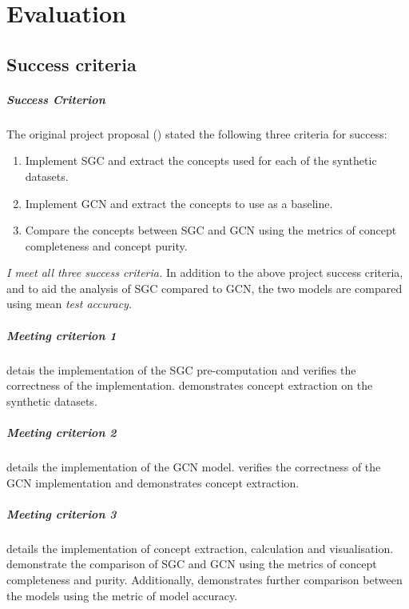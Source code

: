 \chapter{Evaluation}
\label{ch:evaluation}

\section{Success criteria}

\paragraph{Success Criterion}
The original project proposal () stated the following three criteria for success:
\begin{enumerate}
    \item 
        Implement SGC and extract the concepts used for each of the synthetic datasets.
        \label{crit1}
    \item 
        Implement GCN and extract the concepts to use as a baseline.
        \label{crit2}
    \item 
        Compare the concepts between SGC and GCN using the metrics of concept completeness and concept purity.
        \label{crit3}
\end{enumerate}

\emph{I meet all three success criteria.}
In addition to the above project success criteria, and to aid the analysis of SGC compared to GCN, the two models are compared using mean \emph{test accuracy}.

\paragraph{Meeting criterion 1}
 detais the implementation of the SGC pre-computation and  verifies the correctness of the implementation.
 demonstrates concept extraction on the synthetic datasets.

\paragraph{Meeting criterion 2}
 details the implementation of the GCN model.
 verifies the correctness of the GCN implementation and demonstrates concept extraction.

\paragraph{Meeting criterion 3}
 details the implementation of concept extraction, calculation and visualisation.
 demonstrate the comparison of SGC and GCN using the metrics of concept completeness and purity.
Additionally,  demonstrates further comparison between the models using the metric of model accuracy.

